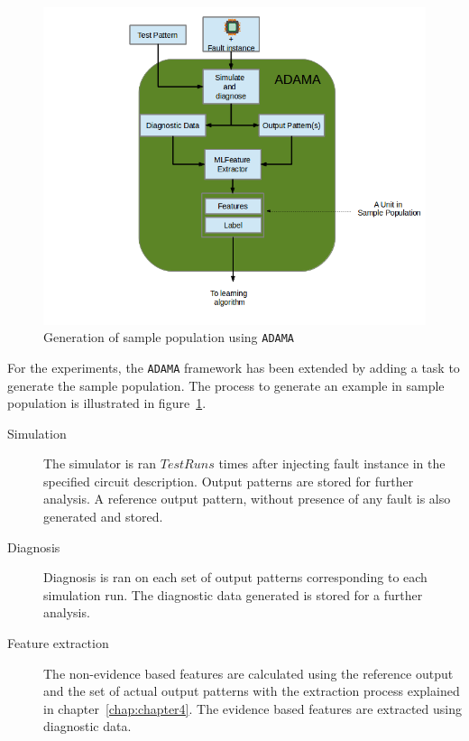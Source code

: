 \begin{figure}[h]
  \begin{center}
    \captionsetup{justification=centering}
    \includegraphics[scale=0.45]{figures/sampopl.png}
    \caption{Generation of sample population using \texttt{ADAMA}}
    \label{fig:sampopl}
  \end{center}
\end{figure}

For the experiments, the \texttt{ADAMA} framework has been extended by adding a task to generate the sample population. The process to generate an example in sample population is illustrated in figure~\ref{fig:sampopl}.

\begin{description}
  \item[Simulation] The simulator is ran $TestRuns$ times after injecting fault instance in the specified circuit description. Output patterns are stored for further analysis. A reference output pattern, without presence of any fault is also generated and stored. 

  \item[Diagnosis] Diagnosis is ran on each set of output patterns corresponding to each simulation run. The diagnostic data generated is stored for a further analysis. 

  \item[Feature extraction] The non-evidence based features are calculated using the reference output and the set of actual output patterns with the extraction process explained in chapter~\ref{chap:chapter4}. The evidence based features are extracted using diagnostic data.

\end{description}

